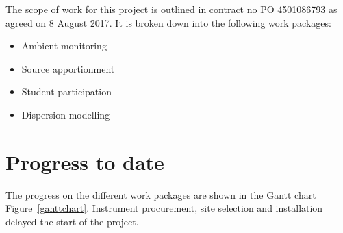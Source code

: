 \documentclass{nwureport}
\begin{document}
The scope of work for this project is outlined in contract no PO 4501086793 as agreed on 8 August 2017. It is broken down into the following work packages:
\begin{itemize}
\item Ambient monitoring
\item Source apportionment
\item Student participation
\item Dispersion modelling
\end{itemize}

\section{Progress to date}

The progress on the different work packages are shown in the Gantt chart Figure~\ref{ganttchart}. Instrument procurement, site selection and installation delayed the start of the project. 
\end{document}
